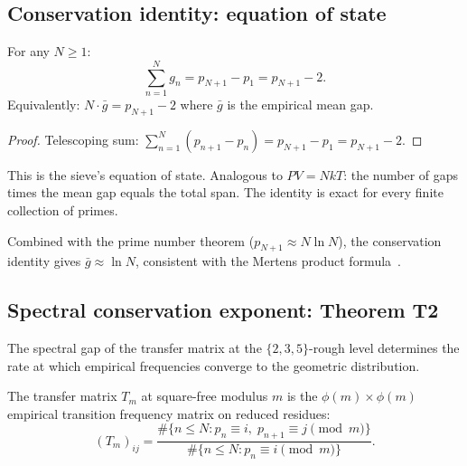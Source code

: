 \documentclass[12pt,a4paper]{article}
\begin{document}
\subsection{Conservation identity: equation of state}
\label{sec:conservation_id}

\mID
\begin{idbox}
\label{id:conservation}
For any $N \geq 1$:
\begin{equation}
  \sum_{n=1}^{N} g_n = p_{N+1} - p_1 = p_{N+1} - 2.
  \label{eq:conservation}
\end{equation}
Equivalently: $N \cdot \bar g = p_{N+1} - 2$ where $\bar g$ is the
empirical mean gap.

\begin{proof}
Telescoping sum: $\sum_{n=1}^N (p_{n+1} - p_n) = p_{N+1} - p_1 = p_{N+1} - 2$.
\end{proof}
\end{idbox}

This is the sieve's equation of state. Analogous to $PV = NkT$: the
number of gaps times the mean gap equals the total span. The identity
is exact for every finite collection of primes.

Combined with the prime number theorem ($p_{N+1} \approx N \ln N$),
the conservation identity gives $\bar g \approx \ln N$, consistent
with the Mertens product formula~\cite{Mertens1874}.

\subsection{Spectral conservation exponent: Theorem T2}
\label{sec:T2}

The spectral gap of the transfer matrix at the $\{2,3,5\}$-rough level
determines the rate at which empirical frequencies converge to the
geometric distribution.

\begin{definition}
The transfer matrix $T_m$ at square-free modulus $m$ is the $\phi(m) \times \phi(m)$
empirical transition frequency matrix on reduced residues:
\[
  (T_m)_{ij} = \frac{\#\{n \leq N : p_n \equiv i,\; p_{n+1} \equiv j \pmod m\}}
               {\#\{n \leq N : p_n \equiv i \pmod m\}}.
\]
\end{definition}
\end{document}
